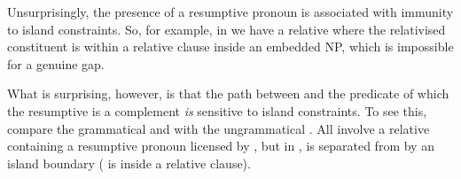 \documentclass[output=paper
 	        ,biblatex
                ,babelshorthands
                ,newtxmath
                ,draftmode
                ,colorlinks, citecolor=brown
]{langscibook}
\begin{document}
Unsurprisingly, the presence of a resumptive pronoun is associated with immunity to island
constraints. So, for example, in  we have a relative where the relativised constituent is within a relative clause inside an embedded NP, which is 
impossible for a genuine gap.
\begin{exe}
\end{exe}
What is surprising, however, is that the path between  and the predicate of
which the resumptive is a complement \emph{is} sensitive to island constraints. To see this, compare
the grammatical  and  with the ungrammatical
. All involve a  relative containing a resumptive pronoun
licensed by , but in ,
 is separated from  by an island boundary ( is inside a relative clause).
\begin{exe}
  \label{x:rc-171}
\end{exe}
\end{document}
